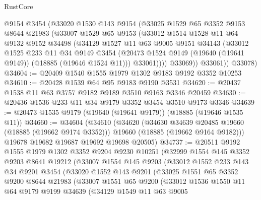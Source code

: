 \begin{lexlean}{RustCore}
\begin{coremodule}
          @9154
          @3454
          (@33020
            @1530
            @143
            @9154
            (@33025
              @1529
              @65
              @3352
              @9153
              @8644
              @21983
              (@33007
                @1529
                @65
                @9153
                (@33012
                  @1514
                  @1528
                  @11
                  @64
                  @9132
                  @9152
                  @34498
                  (@34129
                    @1527
                    @11
                    @63
                    @9005
                    @9151
                    @34143
                    (@33012
                      @1525
                      @233
                      @11
                      @34
                      @9149
                      @3454
                      (@20473 @1524 @9149 (@19640 (@19641 @9149)) (@18885 (@19646 @1524 @11)))
                      @33061))))
              @33069))
          @33061))
      @33078)
@34604 := @20409 @1540 @1555 @1979 @1302 @9183 @9192 @3352 @10253
@34610 := @20428 @1539 @64 @95 @9183 @9190 @3531
@34620 := @20437 @1538 @11 @63 @3757 @9182 @9189 @3510 @9163 @3346 @20459
@34630 := @20436 @1536 @233 @11 @34 @9179 @3352 @3454 @3510 @9173 @3346
@34639 := @20473 @1535 @9179 (@19640 (@19641 @9179)) (@18885 (@19646 @1535 @11))
@34660 := @34604
    (@34610
      (@34620
        (@34630 @34639 @20485 @19660 (@18885 (@19662 @9174 @3352)))
        @19660
        (@18885 (@19662 @9164 @9182)))
      @19678
      @19682
      @19687
      @19692
      @19698
      @20505)
@34737 := @20511
    @9192
    @1555
    @1979
    @1302
    @3352
    @9204
    @9230
    @10251
    (@32999
      @1554
      @145
      @3352
      @9203
      @8641
      @19212
      (@33007
        @1554
        @145
        @9203
        (@33012
          @1552
          @233
          @143
          @34
          @9201
          @3454
          (@33020
            @1552
            @143
            @9201
            (@33025
              @1551
              @65
              @3352
              @9200
              @8644
              @21983
              (@33007
                @1551
                @65
                @9200
                (@33012
                  @1536
                  @1550
                  @11
                  @64
                  @9179
                  @9199
                  @34639
                  (@34129
                    @1549
                    @11
                    @63
                    @9005

\end{coremodule}
\end{lexlean}
